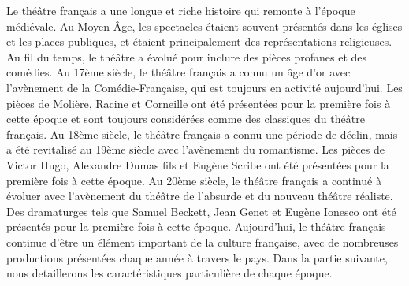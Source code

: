 \documentclass[UTF8,a4paper,12pt]{ctexart}
\numberwithin{equation}{section}
\begin{document}
Le théâtre français a une longue et riche histoire qui remonte à l'époque médiévale. Au Moyen Âge, les spectacles étaient souvent présentés dans les églises et les places publiques, et étaient principalement des représentations religieuses. Au fil du temps, le théâtre a évolué pour inclure des pièces profanes et des comédies. Au 17ème siècle, le théâtre français a connu un âge d'or avec l'avènement de la Comédie-Française, qui est toujours en activité aujourd'hui. Les pièces de Molière, Racine et Corneille ont été présentées pour la première fois à cette époque et sont toujours considérées comme des classiques du théâtre français. Au 18ème siècle, le théâtre français a connu une période de déclin, mais a été revitalisé au 19ème siècle avec l'avènement du romantisme. Les pièces de Victor Hugo, Alexandre Dumas fils et Eugène Scribe ont été présentées pour la première fois à cette époque. Au 20ème siècle, le théâtre français a continué à évoluer avec l'avènement du théâtre de l'absurde et du nouveau théâtre réaliste. Des dramaturges tels que Samuel Beckett, Jean Genet et Eugène Ionesco ont été présentés pour la première fois à cette époque. Aujourd'hui, le théâtre français continue d'être un élément important de la culture française, avec de nombreuses productions présentées chaque année à travers le pays. Dans la partie suivante, nous detaillerons les caractéristiques particulière de chaque époque.\\
\end{document}
